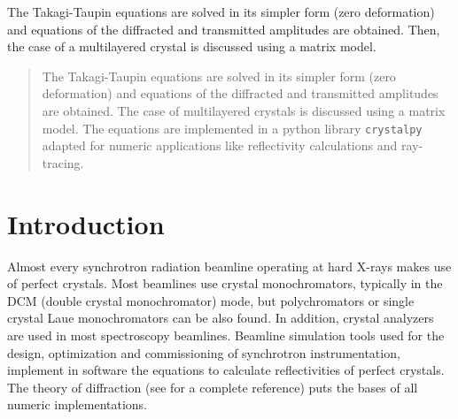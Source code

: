 \documentclass[preprint]{iucr}              %
\begin{document}
\maketitle                        %

\begin{synopsis}
The Takagi-Taupin equations are solved in its simpler form (zero deformation) and equations of the diffracted and transmitted amplitudes are obtained. Then, the case of a multilayered crystal is discussed using a matrix model. 
\end{synopsis}


\begin{abstract}

The Takagi-Taupin equations are solved in its simpler form (zero deformation) and equations of the diffracted and transmitted amplitudes are obtained. The case of multilayered crystals is discussed using a matrix model. The equations are implemented in a python library \texttt{crystalpy} adapted for numeric applications like reflectivity calculations and ray-tracing.

\end{abstract}



\section{Introduction}
\label{sec:Intro}

Almost every synchrotron radiation beamline operating at hard X-rays makes use of perfect crystals.  
Most beamlines use crystal monochromators, typically in the DCM (double crystal monochromator) mode, but polychromators or single crystal Laue monochromators can be also found. In addition, crystal analyzers are used in most spectroscopy beamlines. 
Beamline simulation tools used for the design, optimization and commissioning of synchrotron instrumentation, implement in software the equations to calculate reflectivities of perfect crystals. The theory of diffraction (see \cite{authierbook} for a complete reference) puts the bases of all numeric implementations. 
\end{document}
